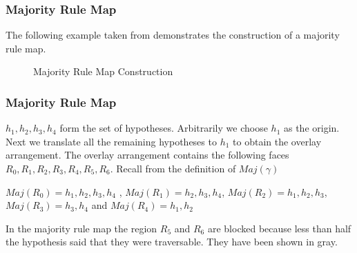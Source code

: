 \documentclass{beamer}
\begin{document}
\frame
{
\frametitle{Majority Rule Map}

The following example taken from \cite{key1} demonstrates the construction of a majority rule map.

\begin{figure}[h]
\begin{center}
\caption{\label{fig:Construction}Majority Rule Map Construction}
\end{center}
\end{figure}
}

\frame
{
\frametitle{Majority Rule Map}

${h_{1},h_{2},h_{3},h_{4}}$ form the set of hypotheses. Arbitrarily we choose $h_{1}$ as the origin. Next we translate all the 
remaining hypotheses to $h_{1}$ to obtain the overlay arrangement. The overlay arrangement contains the following faces
$R_{0},R_{1},R_{2},R_{3},R_{4},R_{5},R_{6}$. Recall from the definition of $Maj(\gamma)$



$  Maj(R_{0})  =  {h_{1}, h_{2}, h_{3}, h_{4}} $ , $  Maj(R_{1})  =  { h_{2}, h_{3}, h_{4}} $, $ Maj(R_{2})  =  {h_{1}, h_{2}, h_{3}} $,
$  Maj(R_{3})  =  {h_{3}, h_{4}} $ and $  Maj(R_{4})  =  {h_{1}, h_{2}} $



In the majority rule map the region $R_{5}$ and $R_{6}$ are blocked because less than half the hypothesis said that they were
 traversable. They have been shown in gray.

}
\end{document}
